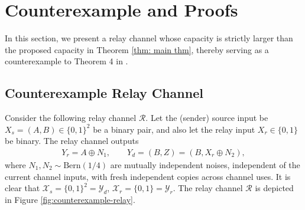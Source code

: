 \documentclass[10pt,a4paper]{amsart}
\begin{document}
\section{Counterexample and Proofs} \label{sec: counterexample and proofs}
In this section, we present a relay channel whose capacity is strictly larger than the proposed capacity in Theorem \ref{thm: main thm}, thereby serving as a counterexample to Theorem 4 in \cite{pon26}.%


\subsection{Counterexample Relay Channel} \label{sec: counterexample channel}
Consider the following relay channel $\mathcal R$. Let the (sender) source input be $X_s = (A,B) \in \{0,1\}^2$ be a binary pair, and also let the relay input $X_r \in \{0,1\}$ be binary. The relay channel outputs
\begin{align*}
    Y_r = A \oplus N_1, \qquad Y_d = (B, Z) = (B, X_r \oplus N_2),
\end{align*}
where $N_1, N_2 \sim \mathrm{Bern}(1/4)$ are mutually independent noises, independent of the current channel inputs, with fresh independent copies across channel uses. It is clear that $\mathcal X_s = \{0,1\}^2 = \mathcal Y_d$, $\mathcal X_r = \{0,1\} = \mathcal Y_r$. The relay channel $\mathcal R$ is depicted in Figure \ref{fig:counterexample-relay}.
\end{document}
